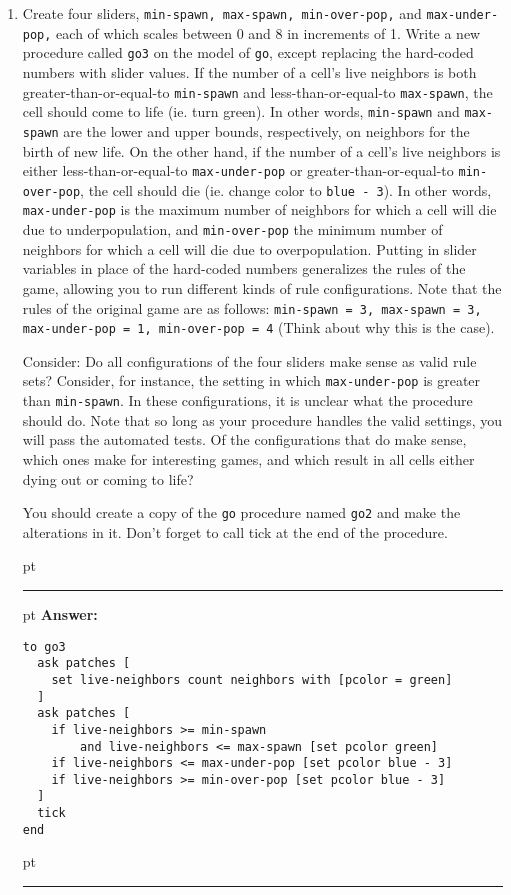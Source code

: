 \documentclass[11pt,oneside]{book}
\begin{document}
\begin{enumerate}
\item Create four sliders, \texttt{min-spawn, max-spawn, min-over-pop,} and \texttt{max-under-pop,} each of which scales between 0 and 8 in increments of 1. Write a new procedure called \texttt{go3} on the model of \texttt{go}, except replacing the hard-coded numbers with slider values. If the number of a cell's live neighbors is both greater-than-or-equal-to \texttt{min-spawn} and less-than-or-equal-to \texttt{max-spawn}, the cell should come to life (ie. turn green). In other words, \texttt{min-spawn} and \texttt{max-spawn} are the lower and upper bounds, respectively, on neighbors for the birth of new life. On the other hand, if the number of a cell's live neighbors is either less-than-or-equal-to \texttt{max-under-pop} or greater-than-or-equal-to \texttt{min-over-pop}, the cell should die (ie. change color to \texttt{blue - 3}). In other words, \texttt{max-under-pop} is the maximum number of neighbors for which a cell will die due to underpopulation, and \texttt{min-over-pop} the minimum number of neighbors for which a cell will die due to overpopulation. Putting in slider variables in place of the hard-coded numbers generalizes the rules of the game, allowing you to run different kinds of rule configurations. Note that the rules of the original game are as follows: \texttt{min-spawn = 3, max-spawn = 3, max-under-pop = 1, min-over-pop = 4} (Think about why this is the case).

Consider: Do all configurations of the four sliders make sense as valid rule sets? Consider, for instance, the setting in which \texttt{max-under-pop} is greater than \texttt{min-spawn}. In these configurations, it is unclear what the procedure should do. Note that so long as your procedure handles the valid settings, you will pass the automated tests. Of the configurations that do make sense, which ones make for interesting games, and which result in all cells either dying out or coming to life?

You should create a copy of the \texttt{go} procedure named \texttt{go2} and make the alterations in it. Don't forget to call tick at the end of the procedure.

\ifnum{}
 pt
\hrule
{} pt
{\bf Answer: }
\begin{verbatim}
to go3
  ask patches [
    set live-neighbors count neighbors with [pcolor = green]
  ]
  ask patches [
    if live-neighbors >= min-spawn 
        and live-neighbors <= max-spawn [set pcolor green]
    if live-neighbors <= max-under-pop [set pcolor blue - 3]
    if live-neighbors >= min-over-pop [set pcolor blue - 3]
  ]
  tick
end
\end{verbatim}
 pt
\hrule
\fi

\end{enumerate}
\end{document}
